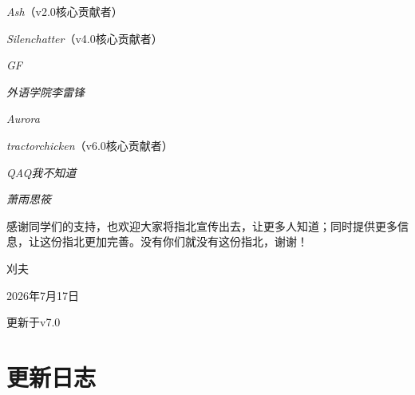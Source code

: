 \documentclass[lang=cn,color=blue,12pt,scheme=chinese,chinesefont=nofont]{elegantbook}
\newcommand{\xw}[1]{{\CJKfamily{xw}#1}}
\begin{document}
\textit{Ash}（v2.0核心贡献者）

\textit{Silenchatter}（v4.0核心贡献者）

\textit{GF}

\textit{外语学院李雷锋}

\textit{Aurora}

\textit{tractorchicken}（v6.0核心贡献者）

\textit{QAQ我不知道}

\textit{萧雨思筱}

\vspace{16.8pt}
感谢同学们的支持，也欢迎大家将指北宣传出去，让更多人知道；同时提供更多信息，让这份指北更加完善。没有你们就没有这份指北，谢谢！
\vspace{16.8pt}
\begin{flushright}
    \xw{刈夫}

    2026年7月17日

    更新于v7.0
\end{flushright}

\chapter{更新日志}
\setlength{\parindent}{0pt}
\end{document}
